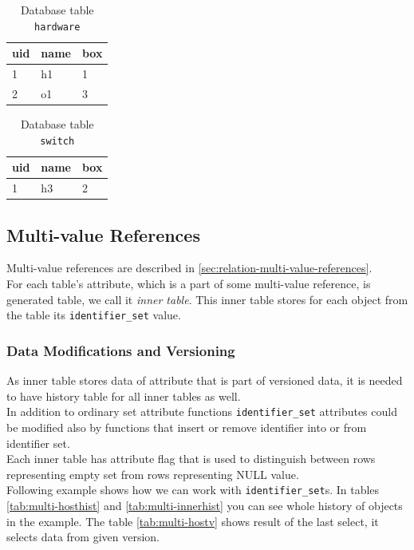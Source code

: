 \documentclass[deska]{subfiles}
\begin{document}
\begin{longtable}{ l | l | l }
    \caption{Database table {\tt hardware}}\\
    uid & name & box\\
    \hline
    \endhead
\label{tab:comp-hw}
    1 & h1 & 1\\
    2 & o1 & 3\\
    \hline
\end{longtable}

\begin{longtable}{ l | l | l }
    \caption{Database table {\tt switch}}\\
    uid & name & box\\
    \hline
    \endhead
\label{tab:comp-switch}
    1 & h3 & 2\\
    \hline
\end{longtable}


\subsection{Multi-value References}
\label{sec:multi-val}
Multi-value references are described in \ref{sec:relation-multi-value-references}.\\
For each table's attribute, which is a part of some multi-value reference, is generated table, we call it {\em inner table}. This inner table stores for each object from the table its {\tt identifier\_set} value.\\

\subsubsection{Data Modifications and Versioning}
As inner table stores data of attribute that is part of versioned data, it is needed to have history table for all inner tables as well.\\ 
In addition to ordinary set attribute functions {\tt identifier\_set} attributes could be modified also by functions that insert or remove identifier into or from identifier set.\\
Each inner table has attribute flag that is used to distinguish between rows representing empty set from rows representing NULL value.\\
Following example shows how we can work with {\tt identifier\_set}s. In tables \ref{tab:multi-hosthist} and \ref{tab:multi-innerhist} you can see whole history of objects in the example. The table \ref{tab:multi-hostv} shows result of the last select, it selects data from given version.
\end{document}
